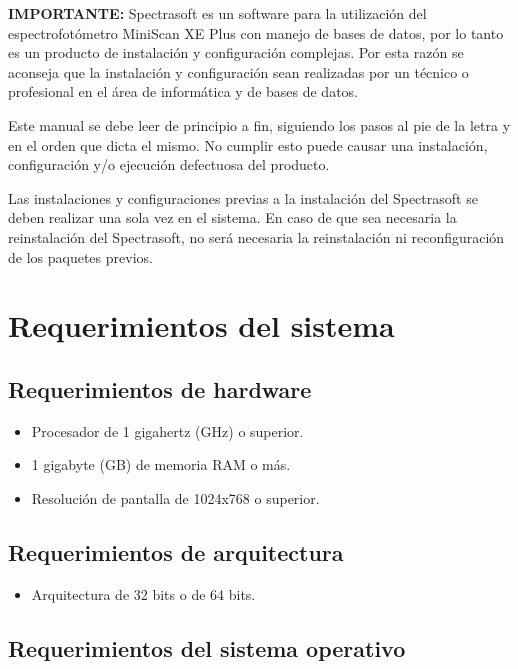 \thispagestyle{empty}
\textbf{IMPORTANTE:} Spectrasoft es un software para la utilizaci\'{o}n del espectrofot\'{o}metro MiniScan XE Plus con manejo de bases de datos, por lo tanto es un producto de instalaci\'{o}n y configuraci\'{o}n complejas. Por esta raz\'{o}n se aconseja que la instalaci\'{o}n y configuraci\'{o}n sean realizadas por un t\'{e}cnico o profesional en el \'{a}rea de inform\'{a}tica y de bases de datos.

Este manual se debe leer de principio a fin, siguiendo los pasos al pie de la letra y en el orden que dicta el mismo. No cumplir esto puede causar una instalaci\'{o}n, configuraci\'{o}n y/o ejecuci\'{o}n defectuosa del producto.

Las instalaciones y configuraciones previas a la instalaci\'{o}n del Spectrasoft se deben realizar una sola vez en el sistema. En caso de que sea necesaria la reinstalaci\'{o}n del Spectrasoft, no ser\'{a} necesaria la reinstalaci\'{o}n ni reconfiguraci\'{o}n de los paquetes previos.
\newpage
\section{Requerimientos del sistema}

\subsection{Requerimientos de hardware}

	\begin{itemize}
		\item Procesador de 1 gigahertz (GHz) o superior.
		
		\item 1 gigabyte (GB) de memoria RAM o m\'{a}s.
		
		\item Resoluci\'{o}n de pantalla de 1024x768 o superior.
	\end{itemize}
	
\subsection{Requerimientos de arquitectura}

	\begin{itemize}
		\item Arquitectura de 32 bits o de 64 bits.
	\end{itemize}

\subsection{Requerimientos del sistema operativo}

